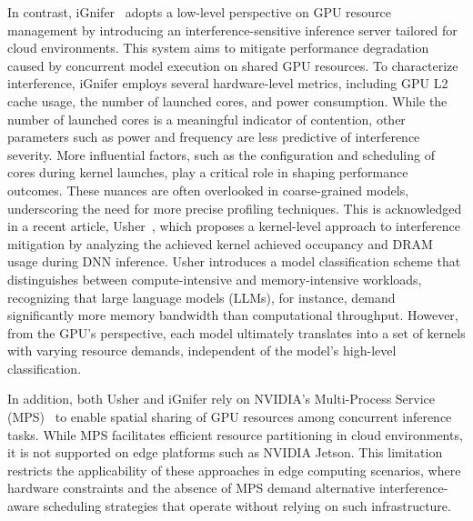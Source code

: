   In contrast, iGnifer~\cite{xu2023iGniter} adopts a low-level perspective on GPU resource management by introducing an interference-sensitive inference server tailored for cloud environments. This system aims to mitigate performance degradation caused by concurrent model execution on shared GPU resources. To characterize interference, iGnifer employs several hardware-level metrics, including GPU L2 cache usage, the number of launched cores, and power consumption. While the number of launched cores is a meaningful indicator of contention, other parameters such as power and frequency are less predictive of interference severity. More influential factors, such as the configuration and scheduling of cores during kernel launches, play a critical role in shaping performance outcomes. These nuances are often overlooked in coarse-grained models, underscoring the need for more precise profiling techniques.
  This is acknowledged in a recent article, Usher~\cite{shubha2024usher}, which proposes a kernel-level approach to interference mitigation by analyzing the achieved kernel achieved occupancy and DRAM usage during DNN inference. Usher introduces a model classification scheme that distinguishes between compute-intensive and memory-intensive workloads, recognizing that large language models (LLMs), for instance, demand significantly more memory bandwidth than computational throughput. However, from the GPU's perspective, each model ultimately translates into a set of kernels with varying resource demands, independent of the model's high-level classification.

  In addition, both Usher and iGnifer rely on NVIDIA's Multi-Process Service (MPS)~\cite{nvidiaMPS575} to enable spatial sharing of GPU resources among concurrent inference tasks. While MPS facilitates efficient resource partitioning in cloud environments, it is not supported on edge platforms such as NVIDIA Jetson. This limitation restricts the applicability of these approaches in edge computing scenarios, where hardware constraints and the absence of MPS demand alternative interference-aware scheduling strategies that operate without relying on such infrastructure.